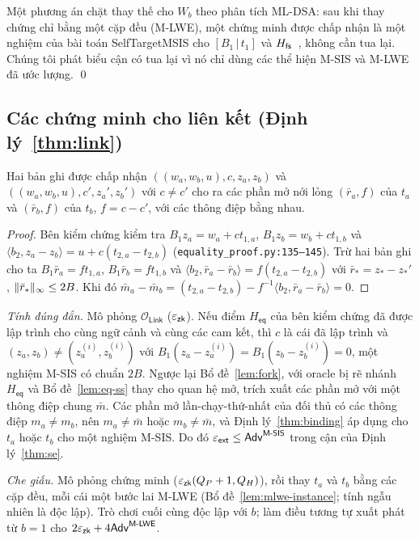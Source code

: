 Một phương án chặt thay thế cho $W_b$ theo phân tích ML-DSA: sau khi thay chứng
chỉ bằng một cặp đều (M-LWE), một chứng minh được chấp nhận là một nghiệm của
bài toán SelfTargetMSIS cho $[B_1\,|\,t_1]$ và $H_{\mathsf{fs}}$~\cite{ref:kls18}, không
cần tua lại. Chúng tôi phát biểu cận có tua lại vì nó chỉ dùng các thể hiện
M-SIS và M-LWE đã ước lượng. \qed

\subsection{Các chứng minh cho liên kết (Định lý~\ref{thm:link})}

\begin{lemma}
\label{lem:eq-ss}
Hai bản ghi được chấp nhận $((w_a,w_b,u),c,z_a,z_b)$ và
$((w_a,w_b,u),c',z_a',z_b')$ với $c\neq c'$ cho ra các phần mở nới lỏng
$(\bar r_a,f)$ của $t_a$ và $(\bar r_b,f)$ của $t_b$, $f=c-c'$, với các thông
điệp bằng nhau.
\end{lemma}
\begin{proof}
Bên kiểm chứng kiểm tra $B_1z_a=w_a+ct_{1,a}$, $B_1z_b=w_b+ct_{1,b}$ và
$\langle b_2,z_a-z_b\rangle=u+c(t_{2,a}-t_{2,b})$
(\texttt{equality\_proof.py:135--145}). Trừ hai bản ghi cho ta
$B_1\bar r_a=ft_{1,a}$, $B_1\bar r_b=ft_{1,b}$ và
$\langle b_2,\bar r_a-\bar r_b\rangle=f(t_{2,a}-t_{2,b})$ với
$\bar r_\ast=z_\ast-z_\ast'$, $\lVert \bar r_\ast \rVert_\infty\le2B$. Khi đó
$\bar m_a-\bar m_b=(t_{2,a}-t_{2,b})-f^{-1}\langle b_2,\bar r_a-\bar r_b\rangle=0$.
\end{proof}

\emph{Tính đúng đắn.} Mô phỏng $\mathcal O_{\mathsf{Link}}$ ($\varepsilon_{\mathsf{zk}}$). Nếu
điểm $H_{\mathsf{eq}}$ của bên kiểm chứng đã được lập trình cho cùng ngữ cảnh và
cùng các cam kết, thì $c$ là cái đã lập trình và $(z_a,z_b)\neq(z_a^{(i)},z_b^{(i)})$
với $B_1(z_a-z_a^{(i)})=B_1(z_b-z_b^{(i)})=0$, một nghiệm M-SIS có chuẩn $2B$.
Ngược lại Bổ đề~\ref{lem:fork}, với oracle bị rẽ nhánh $H_{\mathsf{eq}}$ và
Bổ đề~\ref{lem:eq-ss} thay cho quan hệ mở, trích xuất các phần mở với một thông
điệp chung $\bar m$. Các phần mở lần-chạy-thứ-nhất của đối thủ có các thông điệp
$m_a\neq m_b$, nên $m_a\neq\bar m$ hoặc $m_b\neq\bar m$, và
Định lý~\ref{thm:binding} áp dụng cho $t_a$ hoặc $t_b$ cho một nghiệm M-SIS.
Do đó $\varepsilon_{\mathsf{ext}}\le\mathsf{Adv}^{\textsf{M-SIS}}$ trong cận của
Định lý~\ref{thm:se}.

\emph{Che giấu.} Mô phỏng chứng minh ($\varepsilon_{\mathsf{zk}}(Q_P+1,Q_H)$), rồi thay $t_a$ và
$t_b$ bằng các cặp đều, mỗi cái một bước lai M-LWE (Bổ đề~\ref{lem:mlwe-instance};
tính ngẫu nhiên là độc lập). Trò chơi cuối cùng độc lập với $b$; làm điều tương
tự xuất phát từ $b=1$ cho $2\varepsilon_{\mathsf{zk}}+4\mathsf{Adv}^{\textsf{M-LWE}}$.

